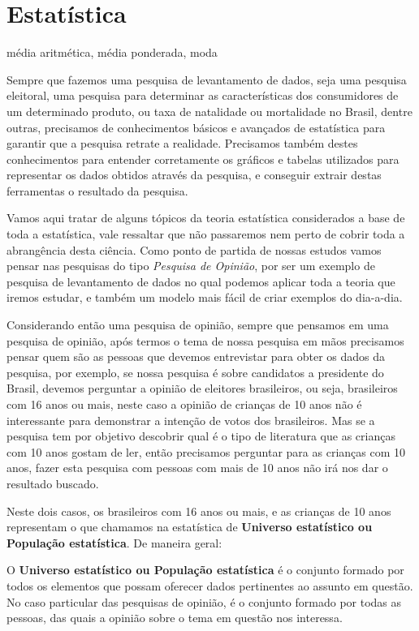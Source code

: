 \chapter{Estatística}

 {\color{red} média aritmética, média ponderada, moda}

Sempre que fazemos uma pesquisa de levantamento de dados, seja uma pesquisa eleitoral, uma pesquisa para determinar as características dos consumidores de um determinado produto, ou taxa de natalidade ou mortalidade no Brasil, dentre outras, precisamos de conhecimentos básicos e avançados de estatística para garantir que a pesquisa retrate a realidade. Precisamos também destes conhecimentos para entender corretamente os gráficos e tabelas utilizados para representar os dados obtidos através da pesquisa, e conseguir extrair destas ferramentas o resultado da pesquisa.

Vamos aqui tratar de alguns tópicos da teoria estatística considerados a base de toda a estatística, vale ressaltar que não passaremos nem perto de cobrir toda a abrangência desta ciência. Como ponto de partida de nossas estudos vamos pensar nas pesquisas do tipo \textit{Pesquisa de Opinião}, por ser um exemplo de pesquisa de levantamento de dados no qual podemos aplicar toda a teoria que iremos estudar, e também um modelo mais fácil de criar exemplos do dia-a-dia.

Considerando então uma pesquisa de opinião, sempre que pensamos em uma pesquisa de opinião, após termos o tema de nossa pesquisa em mãos precisamos pensar quem são as pessoas que devemos entrevistar para obter os dados da pesquisa, por exemplo, se nossa pesquisa é sobre candidatos a presidente do Brasil, devemos perguntar a opinião de eleitores brasileiros, ou seja, brasileiros com 16 anos ou mais, neste caso a opinião de crianças de 10 anos não é interessante para demonstrar a intenção de votos dos brasileiros. Mas se a pesquisa tem por objetivo descobrir qual é o tipo de literatura que as crianças com 10 anos gostam de ler, então precisamos perguntar para as crianças com 10 anos, fazer esta pesquisa com pessoas com mais de 10 anos não irá nos dar o resultado buscado.

Neste dois casos, os brasileiros com 16 anos ou mais, e as crianças de 10 anos representam o que chamamos na estatística de \textbf{Universo estatístico ou População estatística}. De maneira geral:

 \vskip0.3cm
 \colorbox{azul}{
 \begin{minipage}{13cm}
 \begin{center}
  O \textbf{Universo estatístico ou População estatística} é o conjunto formado por todos os elementos que possam oferecer dados pertinentes ao assunto em questão. No caso particular das pesquisas de opinião, é o conjunto formado por todas as pessoas, das quais a opinião sobre o tema em questão nos interessa.
 \end{center}
 \end{minipage}}
 \vskip0.3cm
 
